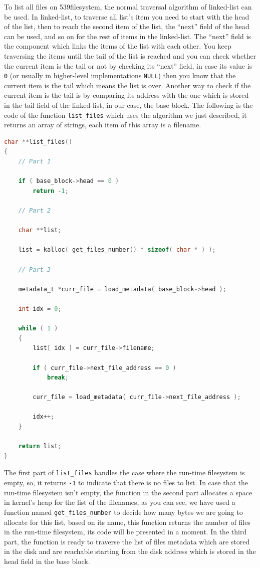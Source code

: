 To list all files on 539filesystem, the normal traversal algorithm of
linked-list can be used. In linked-list, to traverse all list's item you
need to start with the head of the list, then to reach the second item
of the list, the ``next'' field of the head can be used, and so on for
the rest of items in the linked-list. The ``next'' field is the
component which links the items of the list with each other. You keep
traversing the items until the tail of the list is reached and you can
check whether the current item is the tail or not by checking its
``next'' field, in case its value is \lstinline!0! (or usually in
higher-level implementations \lstinline!NULL!) then you know that the
current item is the tail which means the list is over. Another way to
check if the current item is the tail is by comparing its address with
the one which is stored in the tail field of the linked-list, in our
case, the base block. The following is the code of the function
\lstinline!list_files! which uses the algorithm we just described, it
returns an array of strings, each item of this array is a filename.

\begin{lstlisting}[language=C]
char **list_files()
{
    // Part 1
    
    if ( base_block->head == 0 )
        return -1;
    
    // Part 2
    
    char **list;
    
    list = kalloc( get_files_number() * sizeof( char * ) );
    
    // Part 3
    
    metadata_t *curr_file = load_metadata( base_block->head );
    
    int idx = 0;
    
    while ( 1 )
    {
        list[ idx ] = curr_file->filename;

        if ( curr_file->next_file_address == 0 )
            break;
        
        curr_file = load_metadata( curr_file->next_file_address );
        
        idx++;
    }
    
    return list;
}
\end{lstlisting}

The first part of \lstinline!list_files! handles the case where the
run-time filesystem is empty, so, it returns \lstinline!-1! to indicate
that there is no files to list. In case that the run-time filesystem
isn't empty, the function in the second part allocates a space in
kernel's heap for the list of the filenames, as you can see, we have
used a function named \lstinline!get_files_number! to decide how many
bytes we are going to allocate for this list, based on its name, this
function returns the number of files in the run-time filesystem, its
code will be presented in a moment. In the third part, the function is
ready to traverse the list of files metadata which are stored in the
disk and are reachable starting from the disk address which is stored in
the head field in the base block.

